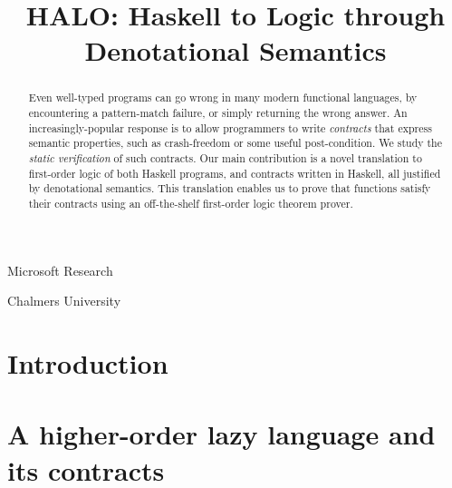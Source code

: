 \documentclass[preprint,nocopyrightspace]{sigplanconf}
\begin{document}
\renewcommand{\Th}{{\cal T}}

\newcommand{\theLang}{\lambda_{\sf HALO}}

\title{HALO: Haskell to Logic through Denotational Semantics}

           {Microsoft Research}{}

           {Chalmers University}{}
\maketitle
\makeatactive

\begin{abstract}
Even well-typed programs can go wrong in many 
modern functional languages, by encountering a pattern-match
failure, or simply returning the wrong answer.  An
increasingly-popular response is to allow programmers to write
\emph{contracts} that express semantic properties, such as
crash-freedom or some useful post-condition. 
We study the \emph{static verification} of such contracts.
Our main contribution is a novel translation to first-order logic 
of both Haskell programs, and contracts written in Haskell,
all justified by denotational semantics. This translation enables us to prove 
that functions satisfy their contracts using an off-the-shelf first-order logic
theorem prover.
\end{abstract}

\section{Introduction}\label{s:intro}
  

%   

\section{A higher-order lazy language and its contracts}\label{sect:language}
  
\end{document}
